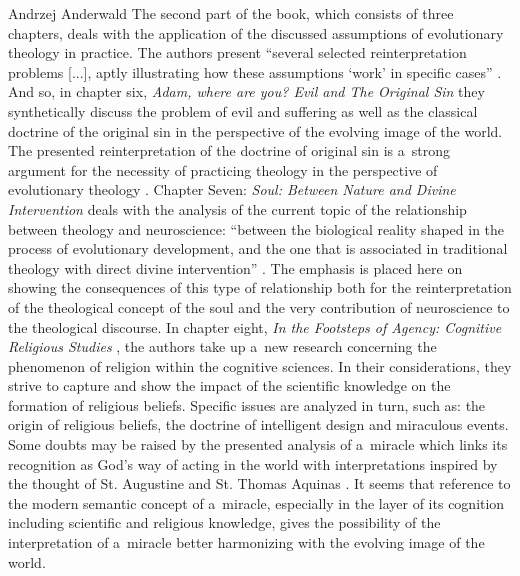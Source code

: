 \begin{newrevengenv}{Andrzej Anderwald}
The second part of the book, which consists of three chapters, deals with the application of the discussed assumptions of evolutionary theology in practice. The authors present ``several selected reinterpretation problems [...], aptly illustrating how these assumptions ‘work' in specific cases'' 
\parencite[][p.13]{grygiel_teologia_2022}. %
 And so, in chapter six, \textit{Adam, where are you? Evil and The Original Sin} 
\parencite*[][pp.153–173]{grygiel_teologia_2022} %
 they synthetically discuss the problem of evil and suffering as well as the classical doctrine of the original sin in the perspective of the evolving image of the world. The presented reinterpretation of the doctrine of original sin is a~strong argument for the necessity of practicing theology in the perspective of evolutionary theology 
\parencite*[][pp.168–170]{grygiel_teologia_2022}. %
 Chapter Seven: \textit{Soul: Between Nature and Divine Intervention} 
\parencite*[][pp.174–196]{grygiel_teologia_2022} %
 deals with the analysis of the current topic of the relationship between theology and neuroscience: ``between the biological reality shaped in the process of evolutionary development, and the one that is associated in traditional theology with direct divine intervention'' 
\parencite[][p.175]{grygiel_teologia_2022}. %
 The emphasis is placed here on showing the consequences of this type of relationship both for the reinterpretation of the theological concept of the soul and the very contribution of neuroscience to the theological discourse. In chapter eight, \textit{In the Footsteps of Agency: Cognitive Religious Studies} 
\parencite*[][pp.197–233]{grygiel_teologia_2022}, %
 the authors take up a~new research concerning the phenomenon of religion within the cognitive sciences. In their considerations, they strive to capture and show the impact of the scientific knowledge on the formation of religious beliefs. Specific issues are analyzed in turn, such as: the origin of religious beliefs, the doctrine of intelligent design and miraculous events. Some doubts may be raised by the presented analysis of a~miracle which links its recognition as God's way of acting in the world with interpretations inspired by the thought of St. Augustine and St. Thomas Aquinas 
\parencite*[][pp.224–230]{grygiel_teologia_2022}. %
 It seems that reference to the modern semantic concept of a~miracle, especially in the layer of its cognition including scientific and religious knowledge, gives the possibility of the interpretation of a~miracle better harmonizing with the evolving image of the world.




\end{newrevengenv}

